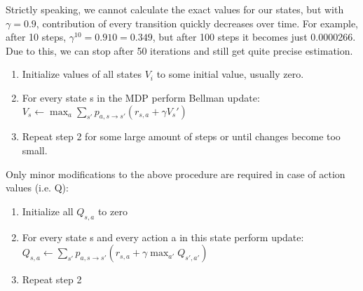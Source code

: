 Strictly speaking, we cannot calculate the exact values for our states, but with
\begin{math}\gamma=0.9\end{math}, contribution of every transition quickly decreases over time. For
example, after 10 steps, \begin{math}\gamma^{10} = 0.910 = 0.349\end{math}, but after 100 steps it becomes just
0.0000266. Due to this, we can stop after 50 iterations and still get quite
precise estimation.



\begin{enumerate}
  \item Initialize values of all states \begin{math}V_i\end{math} to some
    initial value, usually zero.
  \item For every state s in the MDP perform Bellman update: \begin{math}V_s \leftarrow
    \max_a \sum_{s'}p_{a,s \rightarrow s'}(r_{s,a} + \gamma V_s')\end{math}
  \item Repeat step 2 for some large amount of steps or until changes become too small.
\end{enumerate}

Only minor modifications to the above procedure are required in case of action values (i.e. Q):


\begin{enumerate}
  \item Initialize all \begin{math}Q_{s,a}\end{math} to zero
  \item For every state s and every action a in this state perform
    update: \begin{math}Q_{s,a} \leftarrow \sum_{s'}p_{a,s \rightarrow
        s'}(r_{s,a} + \gamma \max_{a'}Q_{s',a'})\end{math}
  \item Repeat step 2
\end{enumerate}


